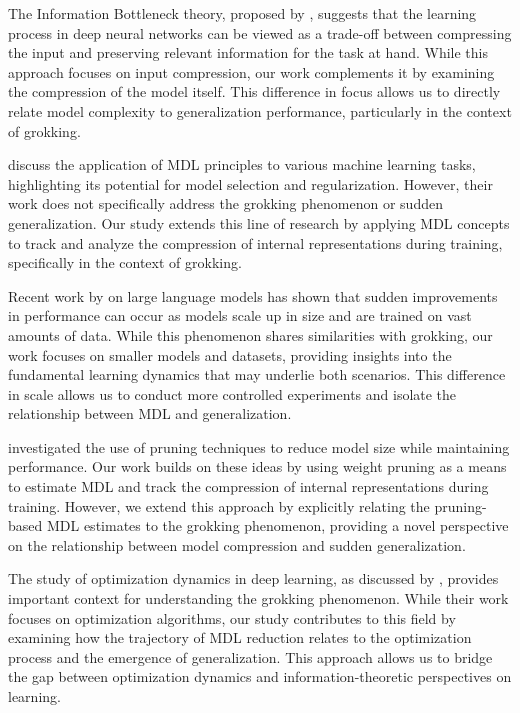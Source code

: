 \documentclass{article} %
\begin{document}
The Information Bottleneck theory, proposed by \citet{bahdanau2014neural}, suggests that the learning process in deep neural networks can be viewed as a trade-off between compressing the input and preserving relevant information for the task at hand. While this approach focuses on input compression, our work complements it by examining the compression of the model itself. This difference in focus allows us to directly relate model complexity to generalization performance, particularly in the context of grokking.

\citet{paszke2019pytorch} discuss the application of MDL principles to various machine learning tasks, highlighting its potential for model selection and regularization. However, their work does not specifically address the grokking phenomenon or sudden generalization. Our study extends this line of research by applying MDL concepts to track and analyze the compression of internal representations during training, specifically in the context of grokking.

Recent work by \citet{radford2019language} on large language models has shown that sudden improvements in performance can occur as models scale up in size and are trained on vast amounts of data. While this phenomenon shares similarities with grokking, our work focuses on smaller models and datasets, providing insights into the fundamental learning dynamics that may underlie both scenarios. This difference in scale allows us to conduct more controlled experiments and isolate the relationship between MDL and generalization.

\citet{kingma2014adam} investigated the use of pruning techniques to reduce model size while maintaining performance. Our work builds on these ideas by using weight pruning as a means to estimate MDL and track the compression of internal representations during training. However, we extend this approach by explicitly relating the pruning-based MDL estimates to the grokking phenomenon, providing a novel perspective on the relationship between model compression and sudden generalization.

The study of optimization dynamics in deep learning, as discussed by \citet{loshchilov2017adamw}, provides important context for understanding the grokking phenomenon. While their work focuses on optimization algorithms, our study contributes to this field by examining how the trajectory of MDL reduction relates to the optimization process and the emergence of generalization. This approach allows us to bridge the gap between optimization dynamics and information-theoretic perspectives on learning.
\end{document}
